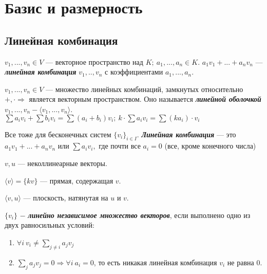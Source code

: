 \section{Базис и размерность}
\subsection{Линейная комбинация}

\begin{definition}
    $v_1,...,v_n\in V$ — векторное пространство над $K;\ a_1,...,a_n\in 
K$. $a_1v_1+...+a_nv_n$ $—$ \textbf{\textit{линейная комбинация}} 
$v_1,..,v_n$ с коэффициентами $a_1,...,a_n$.
\end{definition}

\begin{definition}
    $v_1,...,v_n\in V$ — множество линейных комбинаций, замкнутых 
относительно $+,\cdot\Rightarrow$  является векторным пространством. Оно 
называется \textbf{\textit{линейной оболочкой}} $v_1,...,v_n - \langle 
v_1,...,v_n \rangle$. \\
    $\sum a_iv_i+\sum b_iv_i=\sum (a_i+b_i)v_i;\ k\cdot \sum a_iv_i=\sum 
(ka_i)\cdot v_i$
\end{definition}

\begin{remark}
    Все тоже для бесконечных систем $\{v_i\}_{i\in I}$. 
\textbf{\textit{Линейная комбинация}} — это $a_1v_1+...+a_nv_n$ или $\sum 
a_iv_i,$ где почти все $a_i=0$ (все, кроме конечного числа)
\end{remark}

\begin{example}
    $v, u$ — неколлинеарные векторы. 
    
    $\langle v \rangle =\{kv \}$ — прямая, содержащая $v$.
    
    $\langle v,u \rangle$  — плоскость, натянутая на $u$ и $v$.
\end{example}

\begin{definition}
    $\{v_i\}$ $-$ \textbf{\textit{линейно независимое множество 
векторов}}, если выполнено одно из двух равносильных условий:
    \begin{enumerate}
        \item $\forall i\ v_i\neq \sum\limits_{j\neq i}a_jv_j$
        \item $\sum\limits_{j}a_jv_j=0\Rightarrow \forall i\ a_i=0$, то 
есть никакая линейная комбинация $v_i$ не равна 0.
    \end{enumerate}
\end{definition}

